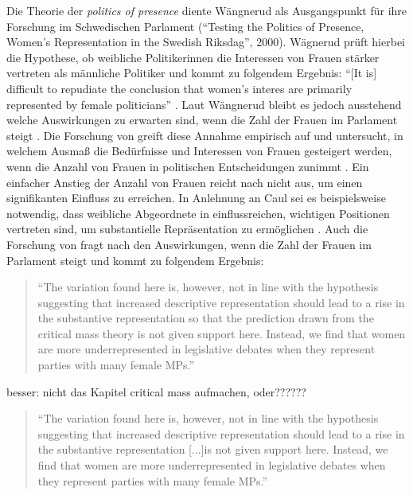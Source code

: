 \documentclass[12pt, 
    twoside=false, 
    bibliography=totoc, 
    numbers=endperiod, 
    headings=normal, 
    toc=chapterentrydotfill
    ]{scrbook}
\begin{document}
%
Die Theorie der \emph{politics of presence} \parencite{phillips_1998} diente Wängnerud \parencite*{wangnerud_2000} als Ausgangspunkt für ihre Forschung im Schwedischen Parlament (\enquote{Testing the Politics of Presence, Women's Representation in the Swedish Riksdag}, 2000). Wägnerud prüft hierbei die Hypothese, ob weibliche Politikerinnen die Interessen von Frauen stärker vertreten als männliche Politiker \parencite[84]{wangnerud_2000} und kommt zu folgendem Ergebnis: \enquote{[It is] difficult to repudiate the conclusion that women's interes are primarily represented by female politicians} \parencite[][84]{wangnerud_2000}. Laut Wängnerud \parencite*{wangnerud_2000} bleibt es jedoch ausstehend welche Auswirkungen zu erwarten sind, wenn die Zahl der Frauen im Parlament steigt \parencite{wangnerud_2009}.
Die Forschung von \textcite{celis_2008} greift diese Annahme empirisch auf und untersucht, in welchem Ausmaß die Bedürfnisse und Interessen von Frauen gesteigert werden, wenn die Anzahl von Frauen in politischen Entscheidungen zunimmt \parencite[vgl. auch][4]{galligan_2016}. Ein einfacher Anstieg der Anzahl von Frauen reicht nach \textcite{celis_2008} nicht aus, um einen signifikanten Einfluss zu erreichen. In Anlehnung an Caul \parencite*{caul_2001} sei es beispielsweise notwendig, dass weibliche Abgeordnete in einflussreichen, wichtigen Positionen vertreten sind, um substantielle Repräsentation zu ermöglichen \parencites{caul_2001}[vgl. auch][14]{coffe_2013}.
Auch die Forschung von \textcite{back_2014} fragt nach den Auswirkungen, wenn die Zahl der Frauen im Parlament steigt und kommt zu folgendem Ergebnis: 

\begin{quote}
  \enquote{The variation found here is, however, not in line with the hypothesis suggesting that increased descriptive representation should lead to a rise in the substantive representation so that the prediction drawn from the critical mass theory is not given support here. Instead, we find that women are more underrepresented in legislative debates when they represent parties with many female MPs.}
  \parencite[17]{back_2018}
\end{quote}
besser: nicht das Kapitel critical mass aufmachen, oder?????? 
\begin{quote}
  \enquote{The variation found here is, however, not in line with the hypothesis suggesting that increased descriptive representation should lead to a rise in the substantive representation [...]is not given support here. Instead, we find that women are more underrepresented in legislative debates when they represent parties with many female MPs.}
  \parencite[17]{back_2018}
\end{quote}
\end{document}
